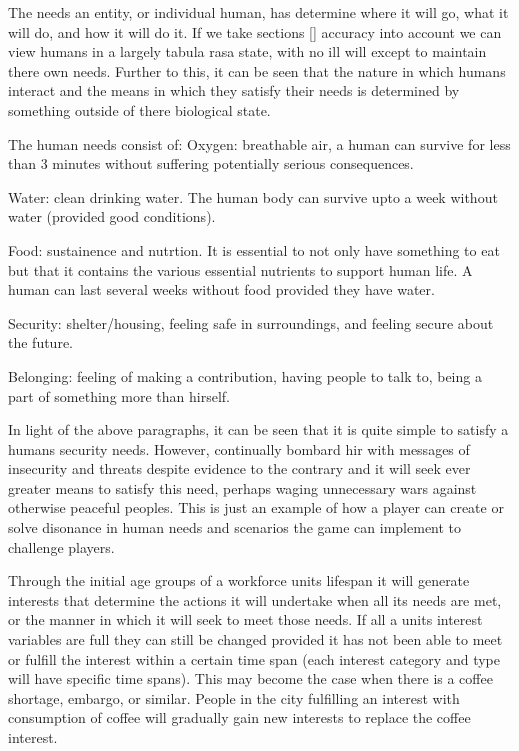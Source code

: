 The needs an entity, or individual human, has determine where it will go, what it will do, and how it will do it. If we take sections [] accuracy into account we can view humans in a largely tabula rasa state, with no ill will except to maintain there own needs. Further to this, it can be seen that the nature in which humans interact and the means in which they satisfy their needs is determined by something outside of there biological state. 

The human needs consist of:
Oxygen: breathable air, a human can survive for less than 3 minutes without suffering potentially serious consequences. 

Water: clean drinking water. The human body can survive upto a week without water (provided good conditions). 

Food: sustainence and nutrtion. It is essential to not only have something to eat but that it contains the various essential nutrients to support human life. A human can last several weeks without food provided they have water.

Security: shelter/housing, feeling safe in surroundings, and feeling secure about the future.

Belonging: feeling of making a contribution, having people to talk to, being a part of something more than hirself.

In light of the above paragraphs, it can be seen that it is quite simple to satisfy a humans security needs. However, continually bombard hir with messages of insecurity and threats despite evidence to the contrary and it will seek ever greater means to satisfy this need, perhaps waging unnecessary wars against otherwise peaceful peoples. This is just an example of how a player can create or solve disonance in human needs and scenarios the game can implement to challenge players.

Through the initial age groups of a workforce units lifespan it will generate interests that determine the actions it will undertake when all its needs are met, or the manner in which it will seek to meet those needs. If all a units interest variables are full they can still be changed provided it has not been able to meet or fulfill the interest within a certain time span (each interest category and type will have specific time spans). This may become the case when there is a coffee shortage, embargo, or similar. People in the city fulfilling an interest with consumption of coffee will gradually gain new interests to replace the coffee interest.

